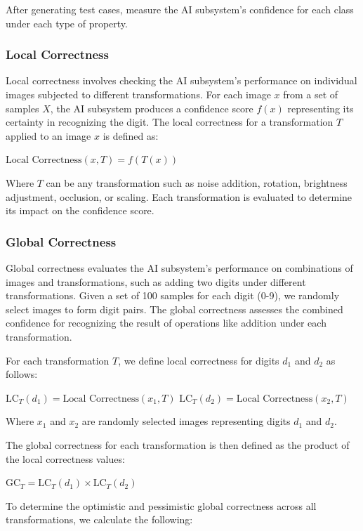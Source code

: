 \documentclass[10pt, conference, a4paper, final]{IEEEtran}
\begin{document}
 After generating test cases, measure the  AI subsystem's confidence for each class under each type of property.
     

  
    \subsubsection{Local Correctness}

    Local correctness involves checking the AI subsystem's performance on individual images subjected to different transformations. For each image $x$ from a set of samples $X$, the AI subsystem produces a confidence score $f(x)$ representing its certainty in recognizing the digit. The local correctness for a transformation $T$ applied to an image $x$ is defined as:


    $ \text{Local Correctness}(x, T) = f(T(x))$


    Where $T$ can be any transformation such as noise addition, rotation, brightness adjustment, occlusion, or scaling. Each transformation is evaluated to determine its impact on the confidence score.

    
    \subsubsection{Global Correctness}

    Global correctness evaluates the AI subsystem's performance on combinations of images and transformations, such as adding two digits under different transformations. Given a set of 100 samples for each digit (0-9), we randomly select images to form digit pairs. The global correctness assesses the combined confidence for recognizing the result of operations like addition under each transformation.

    For each transformation $T$, we define local correctness for digits $d_1$ and $d_2$ as follows:
    
    $ \text{LC}_{T}(d_1) = \text{Local Correctness}(x_1, T)$
    $\text{LC}_{T}(d_2) = \text{Local Correctness}(x_2, T)$
    

    Where $x_1$ and $x_2$ are randomly selected images representing digits $d_1$ and $d_2$.
    
    The global correctness for each transformation is then defined as the product of the local correctness values:
    
    $\text{GC}_{T} = \text{LC}_{T}(d_1) \times \text{LC}_{T}(d_2)$
    
    To determine the optimistic and pessimistic global correctness across all transformations, we calculate the following:
    
\end{document}
